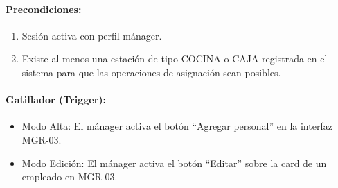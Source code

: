 \paragraph{Precondiciones:}
\begin{enumerate}
    \item[I.] Sesión activa con perfil mánager.
    \item[II.] Existe al menos una estación de tipo COCINA o CAJA registrada en el sistema para que las operaciones de asignación sean posibles.
\end{enumerate}

\paragraph{Gatillador (Trigger):}
\begin{itemize}
    \item Modo Alta: El mánager activa el botón ``Agregar personal'' en la interfaz MGR-03.
    \item Modo Edición: El mánager activa el botón ``Editar'' sobre la card de un empleado en MGR-03.
\end{itemize}

